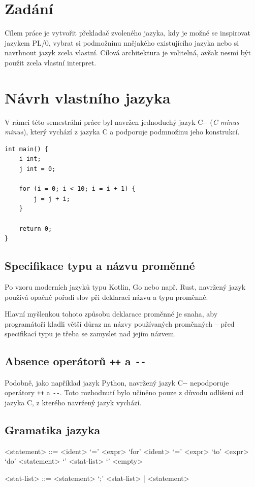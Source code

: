 \documentclass[12pt, a4paper]{article}
\let\oldsection\section
\renewcommand\section{\clearpage\oldsection}
\begin{document}
    \tableofcontents
    \pagebreak

    
\section{Zadání}

    Cílem práce je vytvořit překladač zvoleného jazyka, kdy je možné se inspirovat jazykem PL/0, vybrat si podmožninu nnějakého existujícího jazyka nebo si navrhnout jazyk zcela vlastní. Cílová architektura je volitelná, avšak nesmí být použit zcela vlastní interpret.


\section{Návrh vlastního jazyka}

V rámci této semestrální práce byl navržen jednoduchý jazyk C-{}- (\textit{C minus minus}), který vychází z jazyka C a podporuje podmnožinu jeho konstrukcí.

\begin{lstlisting}[caption={Ukázka programu v jazyce C-{}-}, captionpos=b]
int main() {
    i int;
    j int = 0;

    for (i = 0; i < 10; i = i + 1) {
        j = j + i;
    }

    return 0;
}
\end{lstlisting}


\subsection{Specifikace typu a názvu proměnné}
Po vzoru moderních jazyků typu Kotlin, Go nebo např. Rust, navržený jazyk používá opačné pořadí slov při deklaraci názvu a typu proměnné. 

Hlavní myšlenkou tohoto způsobu deklarace proměnné je snaha, aby programátoři kladli větší důraz na názvy používaných proměnných -- před specifikací typu je třeba se zamyslet nad jejím názvem. 

\subsection{Absence operátorů \texttt{++} a \texttt{-{}-}}

Podobně, jako například jazyk Python, navržený jazyk C-{}- nepodporuje operátory \texttt{++} a \texttt{-{}-}. Toto rozhodnutí bylo učiněno pouze z důvodu odlišení od jazyka C, z kterého navržený jazyk vychází.

\subsection{Gramatika jazyka}
\begin{grammar}

<statement> ::= <ident> `=' <expr> 
\alt `for' <ident> `=' <expr> `to' <expr> `do' <statement> 
\alt `{' <stat-list> `}' 
\alt <empty> 

<stat-list> ::= <statement> `;' <stat-list> | <statement> 

\end{grammar}
\end{document}
